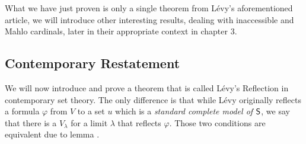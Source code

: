 What we have just proven is only a single theorem from Lévy's aforementioned article, we will introduce other interesting results, dealing with inaccessible and Mahlo cardinals, later in their appropriate context in chapter 3. %


\subsection{Contemporary Restatement}
We will now introduce and prove a theorem that is called Lévy's Reflection in contemporary set theory. The only difference is that while Lévy originally reflects a formula $\varphi$ from $V$ to a set $u$ which is a \emph{standard complete model of $\sf{S}$}, we say that there is a $V_\lambda$ for a limit $\lambda$ that reflects $\varphi$. Those two conditions are equivalent due to lemma .



